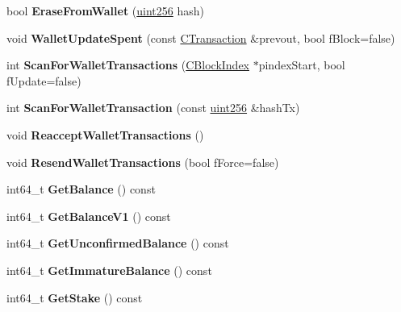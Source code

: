 \begin{DoxyCompactItemize}
bool {\bfseries Erase\+From\+Wallet} (\mbox{\hyperlink{classuint256}{uint256}} hash)
\item 
\mbox{\label{class_c_wallet_a4220bc250d0d8087076197236139b8f8}} 
void {\bfseries Wallet\+Update\+Spent} (const \mbox{\hyperlink{class_c_transaction}{C\+Transaction}} \&prevout, bool f\+Block=false)
\item 
\mbox{\label{class_c_wallet_a979a17e80e4897ed1f4ae9a4be7c493c}} 
int {\bfseries Scan\+For\+Wallet\+Transactions} (\mbox{\hyperlink{class_c_block_index}{C\+Block\+Index}} $\ast$pindex\+Start, bool f\+Update=false)
\item 
\mbox{\label{class_c_wallet_a4c4f404006f5fb2c1b9ae0ee738b1ab9}} 
int {\bfseries Scan\+For\+Wallet\+Transaction} (const \mbox{\hyperlink{classuint256}{uint256}} \&hash\+Tx)
\item 
\mbox{\label{class_c_wallet_a796c23450c8482e10e0c75ae5c1fa8ed}} 
void {\bfseries Reaccept\+Wallet\+Transactions} ()
\item 
\mbox{\label{class_c_wallet_ace33dcf23623d2036a38696bc3a94553}} 
void {\bfseries Resend\+Wallet\+Transactions} (bool f\+Force=false)
\item 
\mbox{\label{class_c_wallet_a85ec3b3a325751400c756ac858c43e63}} 
int64\+\_\+t {\bfseries Get\+Balance} () const
\item 
\mbox{\label{class_c_wallet_af3dd77e5ac43afd9bbfedd8b59f22559}} 
int64\+\_\+t {\bfseries Get\+Balance\+V1} () const
\item 
\mbox{\label{class_c_wallet_aadf7bd2c2bc6e99e443e93d4b6173dde}} 
int64\+\_\+t {\bfseries Get\+Unconfirmed\+Balance} () const
\item 
\mbox{\label{class_c_wallet_a495d3f754ce0394890cf8d9a94361cf4}} 
int64\+\_\+t {\bfseries Get\+Immature\+Balance} () const
\item 
\mbox{\label{class_c_wallet_a07ae1d514c793ae7c725b175ce45b13c}} 
int64\+\_\+t {\bfseries Get\+Stake} () const
\item 

\end{DoxyCompactItemize}
